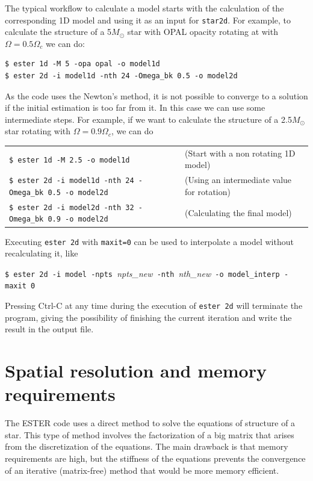The typical workflow to calculate a model starts with the calculation of
the corresponding 1D model and using it as an input for {\tt star2d}. For
example, to calculate the structure of a 5$M_\odot$ star with OPAL
opacity rotating at with $\Omega=0.5\Omega_c$ we can do:

\begin{verbatim}
$ ester 1d -M 5 -opa opal -o model1d
$ ester 2d -i model1d -nth 24 -Omega_bk 0.5 -o model2d
\end{verbatim}

As the code uses the Newton's method, it is not possible
to converge to a solution if the initial estimation is too far from
it. In this case we can use some intermediate steps.  For example, if
we want to calculate the structure of a 2.5$M_\odot$ star rotating with
$\Omega=0.9\Omega_c$, we can do

\medskip
\noindent\begin{tabular}{lp{4.5cm}}
\verb|$ ester 1d -M 2.5 -o model1d |  
&(Start with a non rotating 1D model)\\
\verb|$ ester 2d -i model1d -nth 24 -Omega_bk 0.5 -o model2d| &	
(Using an intermediate value for rotation) \\
\verb|$ ester 2d -i model2d -nth 32 -Omega_bk 0.9 -o model2d| &	
(Calculating the final model) 
\end{tabular}
\medskip

Executing {\tt ester 2d} with {\tt maxit=0} can be used to interpolate a
model without recalculating it, like

\medskip
\noindent
\verb|$ ester 2d -i model -npts |{\it npts\_new}\verb| -nth |{\it nth\_new}\verb| -o model_interp -maxit 0|

\medskip
Pressing Ctrl-C at any time during the execution of {\tt ester 2d} will
terminate the program, giving the possibility of finishing the current
iteration and write the result in the output file.

\section{Spatial resolution and memory requirements}

The ESTER code uses a direct method to solve the equations of structure
of a star. This type of method involves the factorization of a big matrix
that arises from the discretization of the equations.  The main drawback
is that memory requirements are high, but the stiffness of the equations
prevents the convergence of an iterative (matrix-free) method that would
be more memory efficient.

